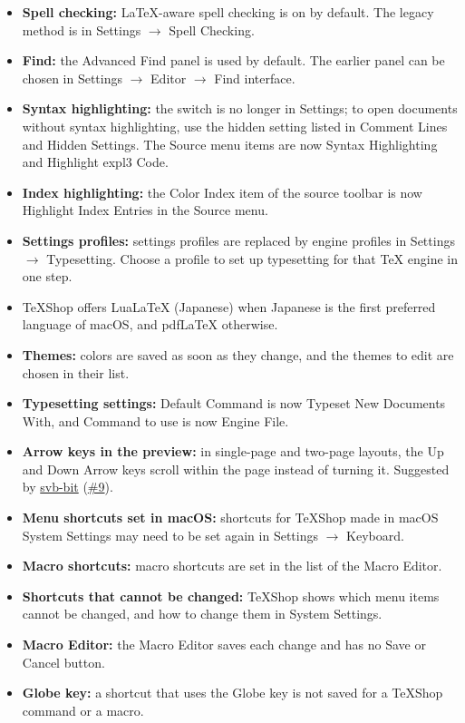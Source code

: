 \documentclass[11pt,letterpaper]{article}
\begin{document}
\begin{itemize}
\item \textbf{Spell checking:} LaTeX-aware spell checking is on by default. The legacy method is in Settings \(\rightarrow\) Spell Checking.
\item \textbf{Find:} the Advanced Find panel is used by default. The earlier panel can be chosen in Settings \(\rightarrow\) Editor \(\rightarrow\) Find interface.
\item \textbf{Syntax highlighting:} the switch is no longer in Settings; to open documents without syntax highlighting, use the hidden setting listed in Comment Lines and Hidden Settings. The Source menu items are now Syntax Highlighting and Highlight expl3 Code.
\item \textbf{Index highlighting:} the Color Index item of the source toolbar is now Highlight Index Entries in the Source menu.
\item \textbf{Settings profiles:} settings profiles are replaced by engine profiles in Settings \(\rightarrow\) Typesetting. Choose a profile to set up typesetting for that TeX engine in one step.
\item TeXShop offers LuaLaTeX (Japanese) when Japanese is the first preferred language of macOS, and pdfLaTeX otherwise.
\item \textbf{Themes:} colors are saved as soon as they change, and the themes to edit are chosen in their list.
\item \textbf{Typesetting settings:} Default Command is now Typeset New Documents With, and Command to use is now Engine File.
\item \textbf{Arrow keys in the preview:} in single-page and two-page layouts, the Up and Down Arrow keys scroll within the page instead of turning it. Suggested by \href{https://github.com/svb-bit}{svb-bit} (\href{https://github.com/TeXShopProject/TeXShop/issues/9}{\#9}).
\item \textbf{Menu shortcuts set in macOS:} shortcuts for TeXShop made in macOS System Settings may need to be set again in Settings \(\rightarrow\) Keyboard.
\item \textbf{Macro shortcuts:} macro shortcuts are set in the list of the Macro Editor.
\item \textbf{Shortcuts that cannot be changed:} TeXShop shows which menu items cannot be changed, and how to change them in System Settings.
\item \textbf{Macro Editor:} the Macro Editor saves each change and has no Save or Cancel button.
\item \textbf{Globe key:} a shortcut that uses the Globe key is not saved for a TeXShop command or a macro.

\end{itemize}
\end{document}
